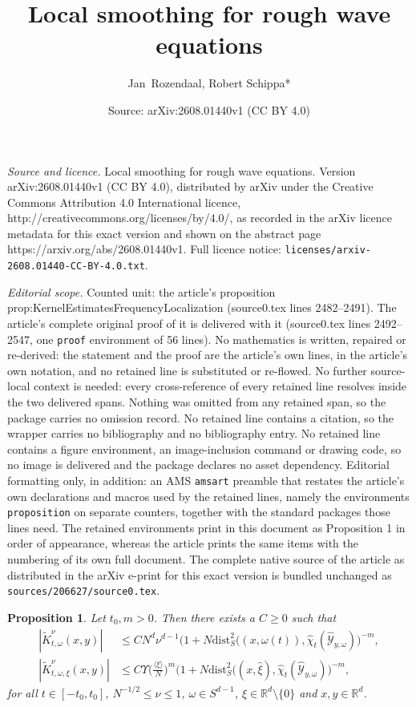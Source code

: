 \documentclass[10pt,a4paper]{amsart}
\title{Local smoothing for rough wave equations}
\author{Jan~Rozendaal, Robert Schippa*}
\date{Source: arXiv:2608.01440v1 (CC BY 4.0)}
\newtheorem{proposition}{Proposition}
\newcommand{\Rd}{\mathbb{R}^{d}}
\newcommand {\lb}{\langle}
\newcommand {\rb}{\rangle}
\newcommand {\w}{\omega}
\begin{document}
\maketitle

\noindent\emph{Source and licence.} Local smoothing for rough wave equations. Version arXiv:2608.01440v1 (CC BY 4.0), distributed by arXiv under the Creative Commons Attribution 4.0 International licence, http://creativecommons.org/licenses/by/4.0/, as recorded in the arXiv licence metadata for this exact version and shown on the abstract page https://arxiv.org/abs/2608.01440v1. Full licence notice: \texttt{licenses/arxiv-2608.01440-CC-BY-4.0.txt}.\par\smallskip

\noindent\textit{Editorial scope.} Counted unit: the article's proposition prop:KernelEstimatesFrequencyLocalization (source0.tex lines 2482--2491). The article's complete original proof of it is delivered with it (source0.tex lines 2492--2547, one \texttt{proof} environment of 56 lines). No mathematics is written, repaired or re-derived: the statement and the proof are the article's own lines, in the article's own notation, and no retained line is substituted or re-flowed.  No further source-local context is needed: every cross-reference of every retained line resolves inside the two delivered spans.  Nothing was omitted from any retained span, so the package carries no omission record.  No retained line contains a citation, so the wrapper carries no bibliography and no bibliography entry.  No retained line contains a figure environment, an image-inclusion command or drawing code, so no image is delivered and the package declares no asset dependency.  Editorial formatting only, in addition: an AMS \texttt{amsart} preamble that restates the article's own declarations and macros used by the retained lines, namely the environments \texttt{proposition} on separate counters, together with the standard packages those lines need.  The retained environments print in this document as Proposition 1 in order of appearance, whereas the article prints the same items with the numbering of its own full document.  The complete native source of the article as distributed in the arXiv e-print for this exact version is bundled unchanged as \texttt{sources/206627/source0.tex}.
\begin{proposition}\label{prop:KernelEstimatesFrequencyLocalization}
Let $t_{0},m>0$. Then there exists a $C\geq0$ such that
\begin{equation*}
\begin{split}
    |\tilde{K}^{\nu}_{t,\w}(x,y)| &\leq CN^{d} \nu^{d-1} \big(1+N \text{dist}_S^2((x,\omega(t)),\hat{\chi}_t(\hat{\mathcal{Y}}_{y,\omega})\big)^{-m},\\
    |\tilde{K}^{\nu}_{t,\w,\xi}(x,y)| &\leq C\Upsilon \big( \tfrac{\lb\xi\rb}{N} \big)^{m}\big(1+ N \text{dist}_S^2((x,\hat{\xi}),\hat{\chi}_t(\hat{\mathcal{Y}}_{y,\omega})\big)^{-m},
\end{split}
\end{equation*}
for all $t\in[-t_{0},t_{0}]$, $N^{-1/2}\leq \nu\leq 1$, $\w\in S^{d-1}$, $\xi\in\Rd\setminus\{0\}$ and $x,y\in\Rd$.
\end{proposition}
\end{document}
